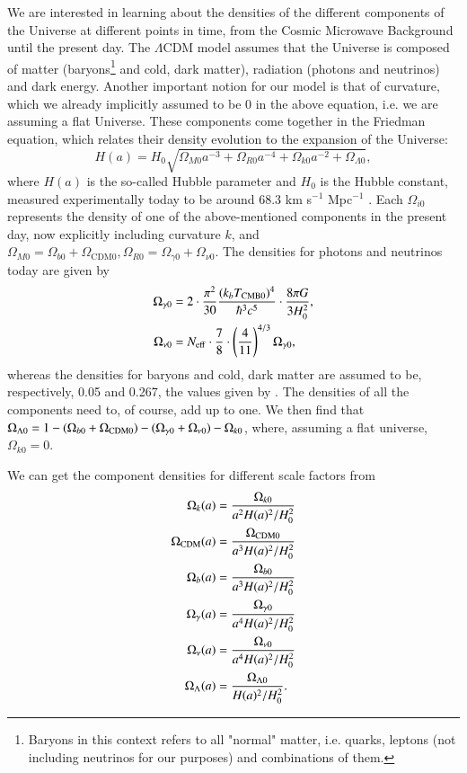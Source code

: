 \documentclass{aa}
\begin{document}
We are interested in learning about the densities of the different components of the Universe at different points in time, from the Cosmic Microwave Background until the present day. The $\Lambda$CDM model assumes that the Universe is composed of matter (baryons\footnote{Baryons in this context refers to all "normal" matter, i.e. quarks, leptons (not including neutrinos for our purposes) and combinations of them.} and cold, dark matter), radiation (photons and neutrinos) and dark energy. Another important notion for our model is that of curvature, which we already implicitly assumed to be 0 in the above equation, i.e. we are assuming a flat Universe. These components come together in the Friedman equation, which relates their density evolution to the expansion of the Universe:
\begin{equation}
H(a) = H_0 \sqrt{\Omega_{M0}a^{-3} + \Omega_{R0}a^{-4} + \Omega_{k 0} a^{-2} + \Omega_{\Lambda 0}},
\end{equation}
where $H(a)$ is the so-called Hubble parameter and $H_0$ is the Hubble constant, measured experimentally today to be around 68.3 km s$^{-1}$ Mpc$^{-1}$ \citep{Kozmanyan_2019}. Each $\Omega_{i0}$ represents the density of one of the above-mentioned components in the present day, now explicitly including curvature $k$, and $\Omega_{M0} = \Omega_{b0} + \Omega_\text{CDM0}, \Omega_{R0} = \Omega_{\gamma0} + \Omega_{\nu0}$. The densities for photons and neutrinos today are given by
\begin{align}
\Omega_{\gamma 0} &= 2\cdot \frac{\pi^2}{30} \frac{(k_bT_{\rm CMB 0})^4}{\hbar^3 c^5} \cdot \frac{8\pi G}{3H_0^2},\\
\Omega_{\nu 0} &= N_{\rm eff}\cdot \frac{7}{8}\cdot \left(\frac{4}{11}\right)^{4/3}\Omega_{\gamma 0},
\end{align}
whereas the densities for baryons and cold, dark matter are assumed to be, respectively, 0.05 and 0.267, the values given by \cite{2020}. The densities of all the components need to, of course, add up to one. We then find that 
$\Omega_{\Lambda 0} = 1 - (\Omega_{b 0}+\Omega_{\rm CDM 0}) - (\Omega_{\gamma 0} + \Omega_{\nu 0}) - \Omega_{k 0}$, where, assuming a flat universe, $\Omega_{k 0} = 0$.

We can get the component densities for different scale factors from
\begin{equation}
\label{eq:omegas}
\begin{aligned}
\Omega_{k}(a) &= \frac{\Omega_{k0}}{a^2H(a)^2/H_0^2}\\
\Omega_{\rm CDM}(a) &= \frac{\Omega_{\rm CDM 0}}{a^3H(a)^2/H_0^2} \\
\Omega_b(a) &= \frac{\Omega_{b 0}}{a^3H(a)^2/H_0^2} \\
\Omega_\gamma(a) &= \frac{\Omega_{\gamma 0}}{a^4H(a)^2/H_0^2} \\
\Omega_{\nu}(a) &= \frac{\Omega_{\nu 0}}{a^4H(a)^2/H_0^2} \\
\Omega_{\Lambda}(a) &= \frac{\Omega_{\Lambda 0}}{H(a)^2/H_0^2}.
\end{aligned}
\end{equation}
\end{document}

